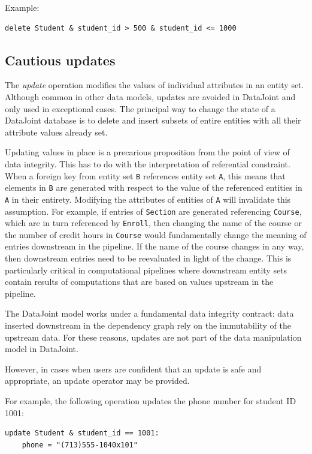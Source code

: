 \documentclass[letter,10pt]{article}
\newcommand{\datajoint}{DataJoint\xspace}
\begin{document}
Example: 
\begin{lstlisting}[language=dj]
delete Student & student_id > 500 & student_id <= 1000
\end{lstlisting}

\subsection{Cautious updates}
The \emph{update} operation modifies the values of individual attributes in an entity set.
Although common in other data models, updates are avoided in \datajoint and only used in exceptional cases.
The principal way to change the state of a \datajoint database is to delete and insert subsets of entire entities with all their attribute values already set. 

Updating values in place is a precarious proposition from the point of view of data integrity. 
This has to do with the interpretation of referential constraint.  
When a foreign key from entity set \lstinline$B$ references entity set \lstinline$A$, this means that elements in \lstinline$B$ are generated with respect to the value of the referenced entities in \lstinline$A$ in their entirety.  
Modifying the attributes of entities of \lstinline$A$ will invalidate this assumption.
For example, if entries of \lstinline$Section$ are generated referencing \lstinline$Course$, which are in turn referenced by \lstinline$Enroll$, then changing the name of the course or the number of credit hours in \lstinline$Course$ would fundamentally change the meaning of entries downstream in the pipeline.  
If the name of the course changes in any way, then downstream entries need to be reevaluated in light of the change.
This is particularly critical in computational pipelines where downstream entity sets contain results of computations that are based on values upstream in the pipeline.  

The \datajoint model works under a fundamental data integrity contract: data inserted downstream in the dependency graph rely on the immutability of the upstream data. 
For these reasons, updates are not part of the data manipulation model in \datajoint.

However, in cases when users are confident that an update is safe and appropriate, an update operator may be provided.

For example, the following operation updates the phone number for student ID 1001:
\begin{lstlisting}[language=dj]
update Student & student_id == 1001:
    phone = "(713)555-1040x101"
\end{lstlisting}
\end{document}
